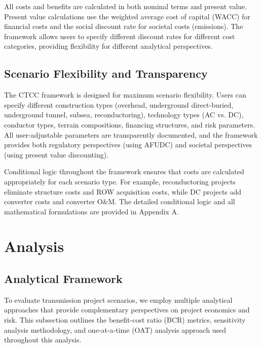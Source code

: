 \documentclass[11pt,twocolumn,a4paper]{article}
\begin{document}
All costs and benefits are calculated in both nominal terms and present value. Present value calculations use the weighted average cost of capital (WACC) for financial costs and the social discount rate for societal costs (emissions). The framework allows users to specify different discount rates for different cost categories, providing flexibility for different analytical perspectives.

\subsection{Scenario Flexibility and Transparency}

The CTCC framework is designed for maximum scenario flexibility. Users can specify different construction types (overhead, underground direct-buried, underground tunnel, subsea, reconductoring), technology types (AC vs. DC), conductor types, terrain compositions, financing structures, and risk parameters. All user-adjustable parameters are transparently documented, and the framework provides both regulatory perspectives (using AFUDC) and societal perspectives (using present value discounting).

Conditional logic throughout the framework ensures that costs are calculated appropriately for each scenario type. For example, reconductoring projects eliminate structure costs and ROW acquisition costs, while DC projects add converter costs and converter O\&M. The detailed conditional logic and all mathematical formulations are provided in Appendix A.



\section{Analysis}


\subsection{Analytical Framework}

To evaluate transmission project scenarios, we employ multiple analytical approaches that provide complementary perspectives on project economics and risk. This subsection outlines the benefit-cost ratio (BCR) metrics, sensitivity analysis methodology, and one-at-a-time (OAT) analysis approach used throughout this analysis.
\end{document}
